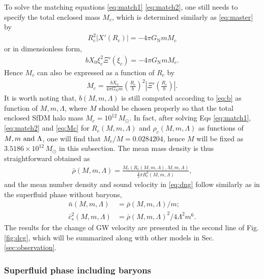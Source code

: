\documentclass[aps,prd,twocolumn,10pt,groupedaddress]{revtex4-1}
\begin{document}
To solve the matching equations \eqref{eq:match1} \eqref{eq:match2}, one still needs to specify the total enclosed mass $M_c$, which is determined similarly as \eqref{eq:master} by
\begin{align}
R_c^2|X'(R_c)|=-4\pi G_\mathrm{N}mM_c
\end{align}
or in dimensionless form,
\begin{align}
bX_0\xi_c^2\Xi'(\xi_c)=-4\pi G_\mathrm{N}mM_c.
\end{align}
Hence $M_c$ can also be expressed as a function of $R_c$ by
\begin{align}\label{eq:Mc}
M_c=\frac{bX_0}{4\pi G_\mathrm{N}m}\left(\frac{R_c}{b}\right)^2\left|\Xi'\left(\frac{R_c}{b}\right)\right|.
\end{align}
It is worth noting that, $b(M,m,\Lambda)$ is still computed according to \eqref{eq:b} as function of $M,m,\Lambda$, where $M$ should be chosen properly so that the total enclosed SfDM halo mass $M_c=10^{12}\,M_\odot$. In fact, after solving Eqs \eqref{eq:match1}, \eqref{eq:match2} and \eqref{eq:Mc} for $R_c(M,m,\Lambda)$ and $\rho_c(M,m,\Lambda)$ as functions of $M,m\ \rm and\ \Lambda$, one will find that $M_c/M=0.0284204$, hence $M$ will be fixed as $3.5186\times10^{12}\,M_\odot$ in this subsection. The mean mass density is thus straightforward obtained as
\begin{align}
\bar{\rho}(M,m,\Lambda)=\frac{M_c(R_c(M,m,\Lambda),M,m,\Lambda)}{\frac43\pi R_c^3(M,m,\Lambda)},
\end{align}
and the mean number density and sound velocity in \eqref{eq:dng} follow similarly as in the superfluid phase without baryons,
\begin{align}
\bar{n}(M,m,\Lambda)&=\bar{\rho}(M,m,\Lambda)/m;\\
\bar{c}_s^2(M,m,\Lambda)&=\bar{\rho}(M,m,\Lambda)^2/4\Lambda^2m^6.
\end{align}
The results for the change of GW velocity are presented in the second line of Fig. \ref{fig:dcg}, which will be summarized along with other models in Sec. \ref{sec:observation}.

\subsubsection{Superfluid phase including baryons} \label{subsubsec:addbaryon}
\end{document}
